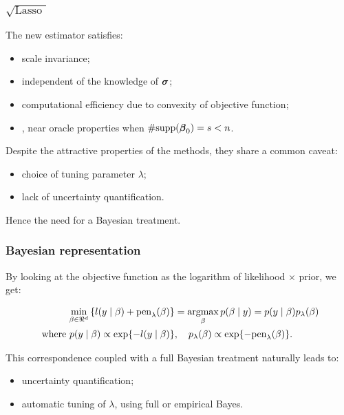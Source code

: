 \documentclass[10pt]{beamer}
\theoremstyle{plain}
\newcommand{\blankline}{\quad\pagebreak[3]}
\def\sql{$\sqrt{\text{Lasso }}$}
\begin{document}
\begin{frame}
	\frametitle{\sql}
	The new estimator satisfies:
	
	\begin{itemize}
		\item scale invariance;
		\item independent of the knowledge of $\boldsymbol{\sigma}$;
		\item computational efficiency due to convexity of objective function;
		\item \cite{belloni2011square}, near oracle properties when $\#\text{supp}(\boldsymbol{\beta}_0) = s < n$.
	\end{itemize}
	
	
	\blankline
	
	Despite the attractive properties of the methods, they share a common caveat:
	
	\begin{itemize}
		\item choice of tuning parameter $\lambda$;
		\item lack of uncertainty quantification.
	\end{itemize}
	Hence the need for a Bayesian treatment.
\end{frame}




\begin{frame}
	\frametitle{Bayesian representation}
	By looking at the objective function as the logarithm of likelihood $\times$ prior, we get:
	
	\blankline
	
	\begin{align}
 \min_{\beta \in \Re^d}
  \left\{
    l(y \mid \beta) + \text{pen}_{\lambda}(\beta) 
  \right\}
  & = \argmax_\beta p(\beta \mid y) = p(y \mid \beta) p_{\lambda}(\beta) \nonumber \\
	\text{ where } p(y \mid \beta) \propto \exp\{-l(y \mid \beta)\} & , \quad p_{\lambda}(\beta)
  \propto \exp\{ -\text{pen}_{\lambda}(\beta) \}. \label{eq:pen}
\end{align}

This correspondence coupled with a full Bayesian treatment naturally leads to:
\begin{itemize}
	\item uncertainty quantification;
	\item automatic tuning of $\lambda$, using full or empirical Bayes.
\end{itemize}
\end{frame}
\end{document}
